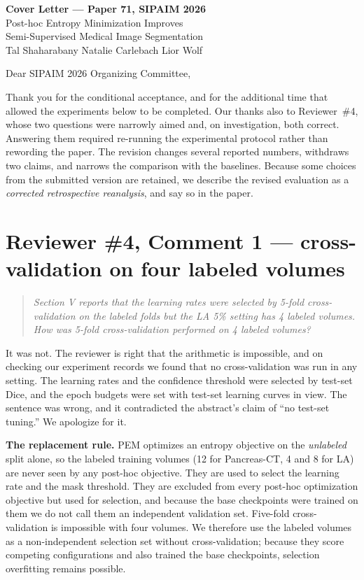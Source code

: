 \documentclass[11pt,a4paper]{article}
\newenvironment{reviewer}{\begin{quote}\itshape\small}{\end{quote}}
\begin{document}
\begin{center}
{\large\bfseries Cover Letter --- Paper 71, SIPAIM 2026}\\[0.6em]
{\normalsize Post-hoc Entropy Minimization Improves\\ Semi-Supervised Medical Image Segmentation}\\[0.4em]
{\small Tal Shaharabany \quad Natalie Carlebach \quad Lior Wolf}
\end{center}

\vspace{0.6em}

Dear SIPAIM 2026 Organizing Committee,

Thank you for the conditional acceptance, and for the additional time that allowed the experiments below to be completed. Our thanks also to Reviewer~\#4, whose two questions were narrowly aimed and, on investigation, both correct. Answering them required re-running the experimental protocol rather than rewording the paper. The revision changes several reported numbers, withdraws two claims, and narrows the comparison with the baselines. Because some choices from the submitted version are retained, we describe the revised evaluation as a \emph{corrected retrospective reanalysis}, and say so in the paper.

\section*{Reviewer \#4, Comment 1 --- cross-validation on four labeled volumes}

\begin{reviewer}
Section V reports that the learning rates were selected by 5-fold cross-validation on the labeled folds but the LA 5\% setting has 4 labeled volumes. How was 5-fold cross-validation performed on 4 labeled volumes?
\end{reviewer}

It was not. The reviewer is right that the arithmetic is impossible, and on checking our experiment records we found that no cross-validation was run in any setting. The learning rates and the confidence threshold were selected by test-set Dice, and the epoch budgets were set with test-set learning curves in view. The sentence was wrong, and it contradicted the abstract's claim of ``no test-set tuning.'' We apologize for it.

\textbf{The replacement rule.} PEM optimizes an entropy objective on the \emph{unlabeled} split alone, so the labeled training volumes (12 for Pancreas-CT, 4 and 8 for LA) are never seen by any post-hoc objective. They are used to select the learning rate and the mask threshold. They are excluded from every post-hoc optimization objective but used for selection, and because the base checkpoints were trained on them we do not call them an independent validation set. Five-fold cross-validation is impossible with four volumes. We therefore use the labeled volumes as a non-independent selection set without cross-validation; because they score competing configurations and also trained the base checkpoints, selection overfitting remains possible.
\end{document}
